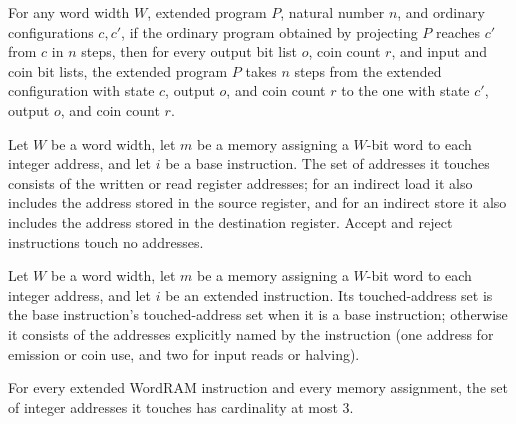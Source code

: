 \begin{theorem}
\label{WordRAM.XSteps.of_steps_proj}
\leanok
{}
For any word width $W$, extended program $P$, natural number $n$, and ordinary
configurations $c,c'$, if the ordinary program obtained by projecting $P$ reaches $c'$
from $c$ in $n$ steps, then for every output bit list $o$, coin count $r$, and input and
coin bit lists, the extended program $P$ takes $n$ steps from the extended configuration
with state $c$, output $o$, and coin count $r$ to the one with state $c'$, output $o$,
and coin count $r$.
\end{theorem}

\begin{definition}
\label{WordRAM.baseTouches}
\leanok
{}
Let $W$ be a word width, let $m$ be a memory assigning a $W$-bit word to each integer
address, and let $i$ be a base instruction. The set of addresses it touches consists of
the written or read register addresses; for an indirect load it also includes the
address stored in the source register, and for an indirect store it also includes the
address stored in the destination register. Accept and reject instructions touch no
addresses.
\end{definition}

\begin{definition}
\label{WordRAM.XInstr.touches}
\leanok
{}
Let $W$ be a word width, let $m$ be a memory assigning a $W$-bit word to each integer
address, and let $i$ be an extended instruction. Its touched-address set is the base
instruction's touched-address set when it is a base instruction; otherwise it consists
of the addresses explicitly named by the instruction (one address for emission or coin
use, and two for input reads or halving).
\end{definition}

\begin{theorem}
\label{WordRAM.XInstr.card_touches_le}
\leanok
{}
For every extended WordRAM instruction and every memory assignment, the set of integer
addresses it touches has cardinality at most $3$.
\end{theorem}

